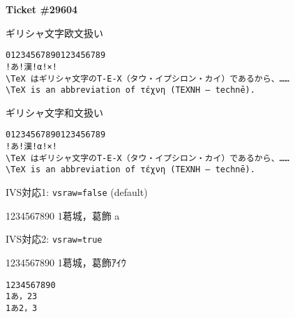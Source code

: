 \documentclass{article}
\begin{document}
\newpage
\textbf{Ticket \#29604}

\setmonofont{DejaVu Sans Mono}
ギリシャ文字欧文扱い

\begin{lstlisting}[basewidth=.5em,basicstyle=\tt, emph={TeX}, emphstyle=\color{red}]
01234567890123456789
!あ!漢!α!×!
\TeX はギリシャ文字のΤ-Ε-Χ（タウ・イプシロン・カイ）であるから、……
\TeX is an abbreviation of τέχνη (ΤΕΧΝΗ – technē).
\end{lstlisting}

ギリシャ文字和文扱い

\begin{lstlisting}[basewidth=.5em,basicstyle=\tt, emph={TeX}, emphstyle=\color{red}]
01234567890123456789
!あ!漢!α!×!
\TeX はギリシャ文字のΤ-Ε-Χ（タウ・イプシロン・カイ）であるから、……
\TeX is an abbreviation of τέχνη (ΤΕΧΝΗ – technē).
\end{lstlisting}

\newpage
IVS対応1: \texttt{vsraw=false} (default)

\begin{LTXexample}[escapechar=\%, basicstyle=\tt]
1234567890
1葛󠄀城，葛󠄁飾
󠄀a
\end{LTXexample}

IVS対応2: \texttt{vsraw=true}

\begin{LTXexample}[escapechar=\%,vsraw, basicstyle=\tt]
1234567890
1葛󠄀城，葛󠄁飾ｱｲｳ
\end{LTXexample}

\begin{lstlisting}[escapechar=\%,vsraw, basewidth=1\zw, basicstyle=\tt]
1234567890
1あ，23
1あ2，3
\end{lstlisting}
\end{document}
